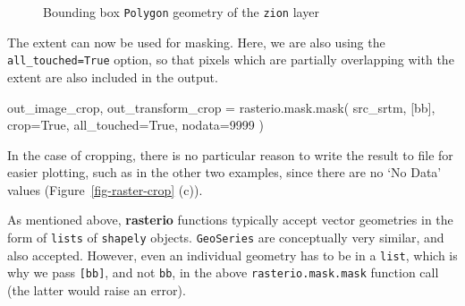 \documentclass[
  letterpaper,
]{krantz}
\newenvironment{Shaded}{\begin{snugshade}}{\end{snugshade}}
\newcommand{\DecValTok}[1]{\textcolor[rgb]{0.68,0.00,0.00}{#1}}
\newcommand{\NormalTok}[1]{\textcolor[rgb]{0.00,0.23,0.31}{#1}}
\newcommand{\OperatorTok}[1]{\textcolor[rgb]{0.37,0.37,0.37}{#1}}
\newcommand{\VariableTok}[1]{\textcolor[rgb]{0.07,0.07,0.07}{#1}}
\begin{document}
\begin{figure}[H]


\caption{\label{fig-zion-bbox}Bounding box
\texttt{\textquotesingle{}Polygon\textquotesingle{}} geometry of the
\texttt{zion} layer}

\end{figure}%

The extent can now be used for masking. Here, we are also using the
\texttt{all\_touched=True} option, so that pixels which are partially
overlapping with the extent are also included in the output.

\begin{Shaded}
\begin{Highlighting}[]
\NormalTok{out\_image\_crop, out\_transform\_crop }\OperatorTok{=}\NormalTok{ rasterio.mask.mask(}
\NormalTok{    src\_srtm, }
\NormalTok{    [bb], }
\NormalTok{    crop}\OperatorTok{=}\VariableTok{True}\NormalTok{, }
\NormalTok{    all\_touched}\OperatorTok{=}\VariableTok{True}\NormalTok{, }
\NormalTok{    nodata}\OperatorTok{=}\DecValTok{9999}
\NormalTok{)}
\end{Highlighting}
\end{Shaded}

In the case of cropping, there is no particular reason to write the
result to file for easier plotting, such as in the other two examples,
since there are no `No Data' values (Figure~\ref{fig-raster-crop} (c)).

\begin{tcolorbox}[enhanced jigsaw, colframe=quarto-callout-note-color-frame, arc=.35mm, leftrule=.75mm, bottomrule=.15mm, coltitle=black, colbacktitle=quarto-callout-note-color!10!white, title=\textcolor{quarto-callout-note-color}{\faInfo}\hspace{0.5em}{Note}, opacityback=0, toptitle=1mm, bottomtitle=1mm, colback=white, opacitybacktitle=0.6, titlerule=0mm, rightrule=.15mm, toprule=.15mm, breakable, left=2mm]

As mentioned above, \textbf{rasterio} functions typically accept vector
geometries in the form of \texttt{lists} of \texttt{shapely} objects.
\texttt{GeoSeries} are conceptually very similar, and also accepted.
However, even an individual geometry has to be in a \texttt{list}, which
is why we pass \texttt{{[}bb{]}}, and not \texttt{bb}, in the above
\texttt{rasterio.mask.mask} function call (the latter would raise an
error).

\end{tcolorbox}
\end{document}
